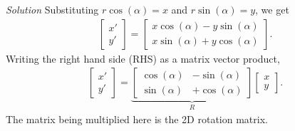 \documentclass{article}
\numberwithin{prob}{section}
\newenvironment{solution}{\emph{Solution}}{}
\begin{document}
\begin{solution}
Substituting $r\cos(\alpha) = x$ and $r\sin(\alpha) = y$, we get
\begin{align}
  \begin{bmatrix}
    x' \\ y'
  \end{bmatrix} 
  = \begin{bmatrix}
    x \cos(\alpha)-y\sin(\alpha) \\
    x \sin(\alpha)+y\cos(\alpha)
  \end{bmatrix}.
\end{align}
Writing the right hand side (RHS) as a matrix vector product,
\begin{align}
  \begin{bmatrix}
    x' \\ y'
  \end{bmatrix} 
  = \underbrace{\begin{bmatrix}
    \cos(\alpha)&-\sin(\alpha) \\
    \sin(\alpha)&+\cos(\alpha)
\end{bmatrix}}_{R}
  \begin{bmatrix}
    x \\ y
  \end{bmatrix}.
\end{align}
The matrix being multiplied here is the 2D rotation matrix.

\end{solution}
\end{document}

